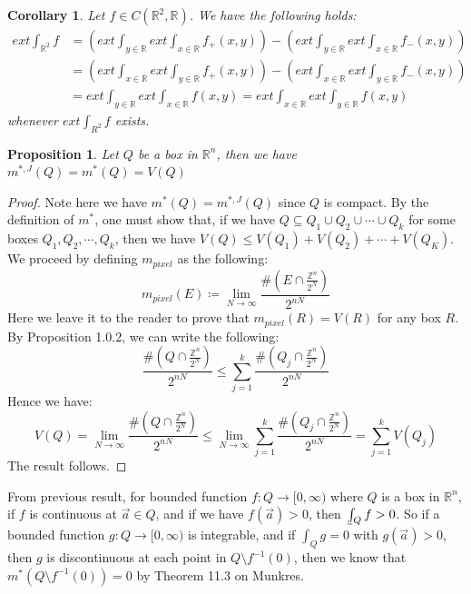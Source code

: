 \documentclass[15pt]{book}
\theoremstyle{break}
\theoremstyle{break}
\newtheorem{prop}[lem]{Proposition}
\newtheorem{corL}{Corollary}[lem]
\def\lowint{\mkern3mu\underline{\vphantom{\intop}\mkern7mu}\mkern-10mu\int}
\newcommand{\R}{\mathbb{R}}
\newcommand{\Z}{\mathbb{Z}}
\begin{document}
\begin{corL}
Let $f \in C\left(\R^2,\R\right)$. We have the following holds:
\begin{align*}
ext\int_{\R^2} f &= \left(ext \int_{y \in \R} ext\int_{x \in \R}f_+(x,y) \right)- \left(ext\int_{y \in \R} ext\int_{x \in \R} f_-(x,y)\right) \\&= \left(ext\int_{x \in \R} ext \int_{y \in \R} f_+ (x,y)\right) - \left(ext \int_{x \in \R} ext \int_{y \in \R} f_-(x,y)\right) \\&= ext \int_{y \in \R} ext\int_{x \in \R} f(x,y) = ext \int_{x \in \R} ext\int_{y \in \R} f(x,y)
\end{align*}
whenever $ext\int_{R^2} f $ exists. 
\end{corL}

\begin{prop}
Let $Q$ be a box in $\R^n$, then we have $ m^{*,J}(Q) = m^*(Q) = V(Q)$
\end{prop}
\begin{proof}
Note here we have $m^*\left(Q\right) = m^{*,J}\left(Q\right)$ since $Q$ is compact. By the definition of $m^*$, one must show that, if we have $Q \subseteq Q_1\cup Q_2\cup \cdots\cup Q_k$ for some boxes $Q_1,Q_2,\cdots,Q_k$, then we have $V\left(Q\right) \leq V\left(Q_1\right) + V\left(Q_2\right) +\cdots +V\left(Q_K\right)$.  We proceed by defining $m_{pixel}$ as the following: $$m_{pixel}\left(E\right) \coloneqq \lim_{N \to \infty} \frac{\#\left(E\cap \frac{\Z^n}{2^N}\right)}{2^{nN}}$$
Here we leave it to the reader to prove that $m_{pixel}\left(R\right) = V\left(R\right)$ for any box $R$. By Proposition 1.0.2, we can write the following:
$$\frac{\#\left(Q\cap \frac{\Z^n}{2^N}\right)}{2^{nN}} \leq \sum_{j=1}^k\frac{\#\left(Q_j\cap \frac{\Z^n}{2^N}\right)}{2^{nN}}$$ Hence we have:
$$V\left(Q\right) = \lim_{N \to \infty} \frac{\#\left(Q\cap \frac{\Z^n}{2^N}\right)}{2^{nN}} \leq \lim_{N \to \infty} \sum_{j=1}^k\frac{\#\left(Q_j\cap \frac{\Z^n}{2^N}\right)}{2^{nN}} = \sum_{j=1}^k V\left(Q_j\right)
$$The result follows.
\end{proof}

From previous result, for bounded function $f:Q \to [0,\infty)$ where $Q$ is a box in $\R^n$, if $f$ is continuous at $\vec{a}\in Q$, and if we have $f(\vec{a})>0$, then $\lowint_Q f >0$. So if a bounded function $g:Q \to [0,\infty)$ is integrable, and if $\int_Q g = 0$ with $g(\vec{a}) >0$, then $g$ is discontinuous at each point in $Q\setminus f^{-1}(0)$, then we know that $m^*(Q\setminus f^{-1}(0)) = 0$ by Theorem 11.3 on Munkres.
\end{document}

